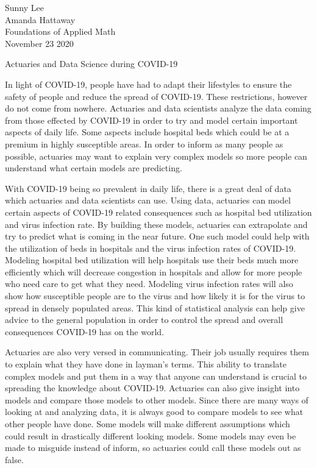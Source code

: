 \documentclass[12pt]{article}
\begin{document}
\begin{flushleft}

Sunny Lee\\
Amanda Hattaway \\
Foundations of Applied Math \\
November 23 2020\\

\begin{center}
  Actuaries and Data Science during COVID-19
\end{center}

\setlength{\parindent}{0.5in} In light of COVID-19, people have had to adapt their 
lifestyles to ensure the safety of people and reduce the spread of COVID-19. These 
restrictions, however do not come from nowhere. Actuaries and data scientists 
analyze the data coming from those effected by COVID-19 in order to try and model
certain important aspects of daily life. Some aspects include hospital beds which 
could be at a premium in highly susceptible areas. In order to inform as many 
people as possible, actuaries may want to explain very complex models so more 
people can understand what certain models are predicting.

With COVID-19 being so prevalent in daily life, there is a great deal of data which 
actuaries and data scientists can use. Using data, actuaries can model certain aspects 
of COVID-19 related consequences such as hospital bed utilization and virus infection rate. 
By building these models, actuaries can extrapolate and try to predict what is coming 
in the near future. One such model could help with the utilization of beds in hospitals
and the virus infection rates of COVID-19\cite{Eaton}.
Modeling hospital bed utilization will help hospitals use their beds much more 
efficiently which will decrease congestion in hospitals and allow for more people 
who need care to get what they need. Modeling virus infection rates will also show 
how susceptible people are to the virus and how likely it is for the virus to spread 
in densely populated areas. This kind of statistical analysis can help 
give advice to the general population in order to control the spread and overall 
consequences COVID-19 has on the world. 

Actuaries are also very versed in communicating. Their job usually requires them to 
explain what they have done in layman's terms. This ability to translate complex 
models and put them in a way that anyone can understand is crucial to spreading the 
knowledge about COVID-19. Actuaries can also give insight into models and compare 
those models to other models\cite{Eaton}. Since there are many ways of looking 
at and analyzing data, it is always good to compare models to see what other people 
have done. Some models will make different assumptions which could result in 
drastically different looking models. Some models may even be made to misguide 
instead of inform, so actuaries could call these models out as false. 


\end{flushleft}
\end{document}
